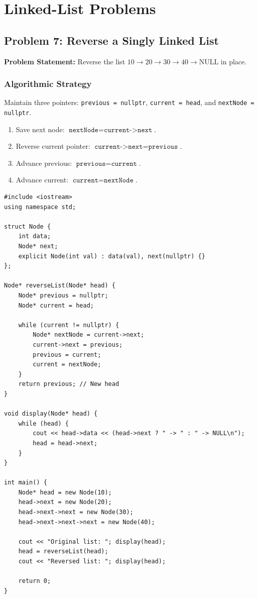 \section{Linked-List Problems}

\subsection{Problem 7: Reverse a Singly Linked List}

\textbf{Problem Statement:} Reverse the list $10 \to 20 \to 30 \to 40 \to \text{NULL}$ in place.

\subsubsection*{Algorithmic Strategy}
Maintain three pointers: \texttt{previous = nullptr}, \texttt{current = head}, and \texttt{nextNode = nullptr}.
\begin{enumerate}
    \item Save next node: $\texttt{nextNode} = \texttt{current->next}$.
    \item Reverse current pointer: $\texttt{current->next} = \texttt{previous}$.
    \item Advance previous: $\texttt{previous} = \texttt{current}$.
    \item Advance current: $\texttt{current} = \texttt{nextNode}$.
\end{enumerate}

\begin{lstlisting}[style=cppstyle, caption={C++ Solution for In-Place Linked List Reversal.}]
#include <iostream>
using namespace std;

struct Node {
    int data;
    Node* next;
    explicit Node(int val) : data(val), next(nullptr) {}
};

Node* reverseList(Node* head) {
    Node* previous = nullptr;
    Node* current = head;

    while (current != nullptr) {
        Node* nextNode = current->next;
        current->next = previous;
        previous = current;
        current = nextNode;
    }
    return previous; // New head
}

void display(Node* head) {
    while (head) {
        cout << head->data << (head->next ? " -> " : " -> NULL\n");
        head = head->next;
    }
}

int main() {
    Node* head = new Node(10);
    head->next = new Node(20);
    head->next->next = new Node(30);
    head->next->next->next = new Node(40);

    cout << "Original list: "; display(head);
    head = reverseList(head);
    cout << "Reversed list: "; display(head);

    return 0;
}
\end{lstlisting}


